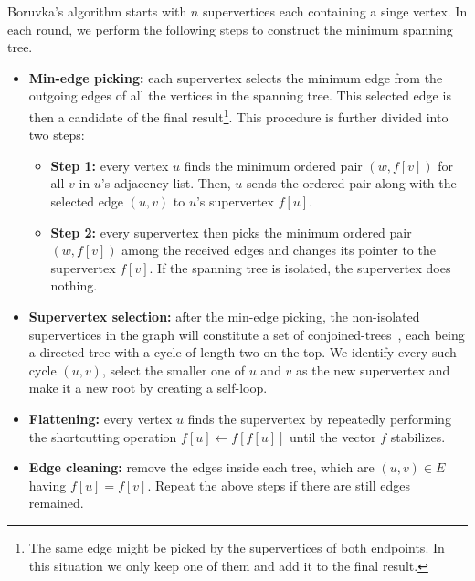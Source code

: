 \documentclass{sokendai_thesis} %
\newcommand{\boruvka}[0]{Boruvka}
\begin{document}
\boruvka{}'s algorithm starts with $n$ supervertices each containing a singe vertex.
In each round, we perform the following steps to construct the minimum spanning tree.
\begin{itemize}
\item \textbf{Min-edge picking:} each supervertex selects the minimum edge from the outgoing edges of all the vertices in the spanning tree.
This selected edge is then a candidate of the final result\footnote{The same edge might be picked by the supervertices of both endpoints. In this situation we only keep one of them and add it to the final result.}.
This procedure is further divided into two steps:
\begin{itemize}
\item \textbf{Step 1:} every vertex $u$ finds the minimum ordered pair $(w, f[v])$ for all $v$ in $u$'s adjacency list.
Then, $u$ sends the ordered pair along with the selected edge $(u, v)$ to $u$'s supervertex $f[u]$.
\item \textbf{Step 2:} every supervertex then picks the minimum ordered pair $(w, f[v])$ among the received edges and changes its pointer to the supervertex $f[v]$.
If the spanning tree is isolated, the supervertex does nothing.
\end{itemize}
\item \textbf{Supervertex selection:} after the min-edge picking, the non-isolated supervertices in the graph will constitute a set of conjoined-trees~\cite{salihoglu2014optimizing}, each being a directed tree with a cycle of length two on the top.
We identify every such cycle $(u, v)$, select the smaller one of $u$ and $v$ as the new supervertex and make it a new root by creating a self-loop.
\item \textbf{Flattening:} every vertex $u$ finds the supervertex by repeatedly performing the shortcutting operation $f[u]\leftarrow f[f[u]]$ until the vector $f$ stabilizes.
\item \textbf{Edge cleaning:} remove the edges inside each tree, which are $(u, v)\in E$ having $f[u]=f[v]$.
Repeat the above steps if there are still edges remained.
\end{itemize}
\end{document}
